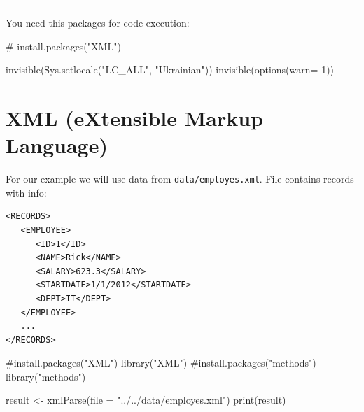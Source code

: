 \documentclass[
  letterpaper,
  DIV=11,
  numbers=noendperiod]{scrreprt}
\newenvironment{Shaded}{\begin{snugshade}}{\end{snugshade}}
\newcommand{\AttributeTok}[1]{\textcolor[rgb]{0.40,0.45,0.13}{#1}}
\newcommand{\CommentTok}[1]{\textcolor[rgb]{0.37,0.37,0.37}{#1}}
\newcommand{\DecValTok}[1]{\textcolor[rgb]{0.68,0.00,0.00}{#1}}
\newcommand{\FunctionTok}[1]{\textcolor[rgb]{0.28,0.35,0.67}{#1}}
\newcommand{\NormalTok}[1]{\textcolor[rgb]{0.00,0.23,0.31}{#1}}
\newcommand{\OtherTok}[1]{\textcolor[rgb]{0.00,0.23,0.31}{#1}}
\newcommand{\SpecialCharTok}[1]{\textcolor[rgb]{0.37,0.37,0.37}{#1}}
\newcommand{\StringTok}[1]{\textcolor[rgb]{0.13,0.47,0.30}{#1}}
\begin{document}
\begin{center}\rule{0.5\linewidth}{0.5pt}\end{center}

You need this packages for code execution:

\begin{Shaded}
\begin{Highlighting}[]
\CommentTok{\# install.packages("XML")}
\end{Highlighting}
\end{Shaded}

\begin{Shaded}
\begin{Highlighting}[]
\FunctionTok{invisible}\NormalTok{(}\FunctionTok{Sys.setlocale}\NormalTok{(}\StringTok{"LC\_ALL"}\NormalTok{, }\StringTok{"Ukrainian"}\NormalTok{))}
\FunctionTok{invisible}\NormalTok{(}\FunctionTok{options}\NormalTok{(}\AttributeTok{warn=}\SpecialCharTok{{-}}\DecValTok{1}\NormalTok{))}
\end{Highlighting}
\end{Shaded}

\section{XML (eXtensible Markup
Language)}\label{xml-extensible-markup-language}

For our example we will use data from \texttt{data/employes.xml}. File
contains records with info:

\begin{verbatim}
<RECORDS>
   <EMPLOYEE>
      <ID>1</ID>
      <NAME>Rick</NAME>
      <SALARY>623.3</SALARY>
      <STARTDATE>1/1/2012</STARTDATE>
      <DEPT>IT</DEPT>
   </EMPLOYEE>
   ...
</RECORDS>
\end{verbatim}

\begin{Shaded}
\begin{Highlighting}[]
\CommentTok{\#install.packages("XML")}
\FunctionTok{library}\NormalTok{(}\StringTok{"XML"}\NormalTok{)}
\CommentTok{\#install.packages("methods")}
\FunctionTok{library}\NormalTok{(}\StringTok{"methods"}\NormalTok{)}
\end{Highlighting}
\end{Shaded}

\begin{Shaded}
\begin{Highlighting}[]
\NormalTok{result }\OtherTok{\textless{}{-}} \FunctionTok{xmlParse}\NormalTok{(}\AttributeTok{file =} \StringTok{"../../data/employes.xml"}\NormalTok{)}
\FunctionTok{print}\NormalTok{(result)}
\end{Highlighting}
\end{Shaded}
\end{document}

